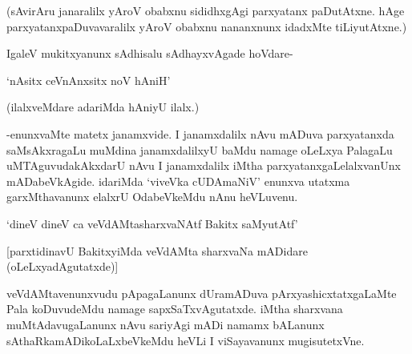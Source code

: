 (sAvirAru janaralilx yAroV obabxnu sididhxgAgi parxyatanx paDutAtxne. hAge parxyatanxpaDuvavaralilx yAroV obabxnu nananxnunx idadxMte tiLiyutAtxne.)

IgaleV mukitxyanunx sAdhisalu sAdhayxvAgade hoVdare-

\begin{shloka}
`nAsitx ceVnAnxsitx noV hAniH'
\end{shloka}

(ilalxveMdare adariMda hAniyU ilalx.)

-enunxvaMte matetx janamxvide. I janamxdalilx nAvu mADuva parxyatanxda saMsAkxragaLu muMdina janamxdalilxyU baMdu namage oLeLxya PalagaLu uMTAguvudakAkxdarU nAvu I janamxdalilx iMtha parxyatanxgaLelalxvanUnx mADabeVkAgide. idariMda `viveVka cUDAmaNiV' enunxva utatxma garxMthavanunx elalxrU OdabeVkeMdu nAnu heVLuvenu.

\begin{shloka}
`dineV dineV ca veVdAMtasharxvaNAtf Bakitx saMyutAtf'
\end{shloka}

[parxtidinavU BakitxyiMda veVdAMta sharxvaNa mADidare (oLeLxyadAgutatxde)]

veVdAMtavenunxvudu pApagaLanunx dUramADuva pArxyashicxtatxgaLaMte Pala koDuvudeMdu namage sapxSaTxvAgutatxde. iMtha sharxvana muMtAdavugaLanunx nAvu sariyAgi mADi namamx bALanunx sAthaRkamADikoLaLxbeVkeMdu heVLi I viSayavanunx mugisutetxVne.


\endchapter
